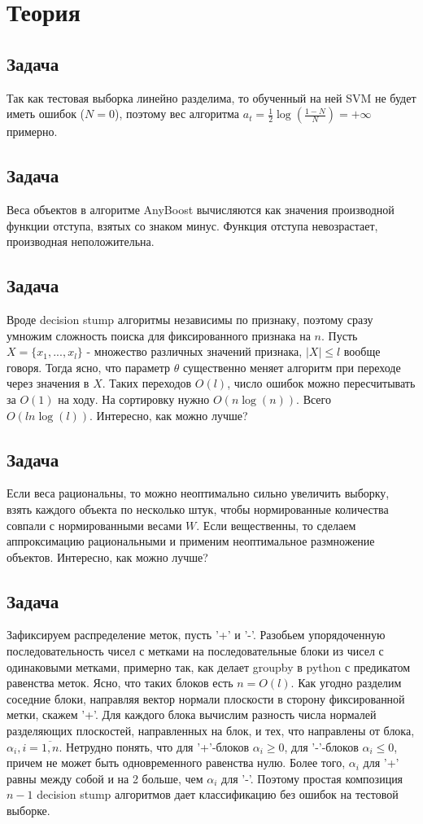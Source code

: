\documentclass[12pt]{article}
\begin{document}
\section{Теория}
\subsection{Задача}
Так как тестовая выборка линейно разделима, то обученный на ней SVM
не будет иметь ошибок ($N = 0$), поэтому вес алгоритма $a_t = \frac{1}{2}\log(\frac{1-N}{N}) = +\infty$
примерно.

\subsection{Задача}
Веса объектов в алгоритме AnyBoost вычисляются как значения производной функции отступа, взятых со знаком минус. Функция отступа невозрастает, производная неположительна.

\subsection{Задача}
Вроде decision stump алгоритмы независимы по признаку, поэтому сразу умножим сложность поиска для фиксированного признака на $n$. 
Пусть $X = \{x_1, ..., x_l\}$ - множество различных значений признака, $|X| \le l$ вообще говоря. Тогда ясно, что параметр $\theta$
существенно меняет алгоритм при переходе через значения в $X$. Таких переходов $O(l)$, число ошибок можно пересчитывать за $O(1)$ на ходу.
На сортировку нужно $O(n\log(n))$. Всего $O(ln\log(l))$. Интересно, как можно лучше?

\subsection{Задача}
Если веса рациональны, то можно неоптимально сильно увеличить выборку, взять каждого объекта по несколько штук, чтобы нормированные
количества совпали с нормированными весами $W$. Если вещественны, то сделаем аппроксимацию рациональными и применим неоптимальное размножение объектов. Интересно, как можно лучше?

\subsection{Задача}
Зафиксируем распределение меток, пусть '+' и '-'. Разобьем упорядоченную последовательность чисел с метками на последовательные блоки
из чисел с одинаковыми метками, примерно так, как делает groupby в python с предикатом равенства меток. Ясно, что таких блоков
есть $n = O(l)$. Как угодно разделим соседние блоки, направляя вектор нормали плоскости в сторону фиксированной метки, скажем '+'.
Для каждого блока вычислим разность числа нормалей разделяющих плоскостей, направленных на блок, и тех, что направлены от блока, $\alpha_i, i=\overline{1,n}$. Нетрудно понять, что для '+'-блоков $\alpha_i \ge 0$, для '-'-блоков $\alpha_i \le 0$, причем не может быть одновременного равенства нулю. Более того, $\alpha_i$ для '+' равны между собой и на 2 больше, чем $\alpha_i$ для '-'. Поэтому простая композиция $n-1$ decision stump алгоритмов дает классификацию без ошибок на тестовой выборке.\\
\end{document}
